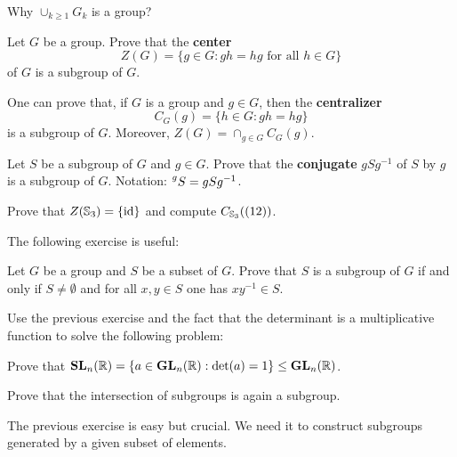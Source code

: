 Why $\cup_{k\geq1}G_k$ is a group? 

\begin{exercise}
\label{xca:center}
        Let $G$ be a group. Prove that the \textbf{center} 
        \[
                Z(G)=\{g\in G:gh=hg\text{ for all $h\in G$}\}
        \]
        of $G$ is a subgroup of $G$. 
\end{exercise}

One can prove that, if $G$ is a group and $g\in G$, then 
the \textbf{centralizer} 
\[
C_G(g)=\{h\in G:gh=hg\}
\]
is a subgroup of $G$. Moreover, 
$Z(G)=\cap_{g\in G}C_G(g)$. 

\begin{exercise}
        \label{xca:conjugate}
        Let $S$ be a subgroup of $G$ and $g\in G$. Prove that
        the \textbf{conjugate} $gSg^{-1}$
        of $S$ by $g$ is a subgroup of $G$. 
        Notation: $\prescript{g}{}S=gSg^{-1}$.
\end{exercise}


\begin{exercise}
\label{xca:center_S3}
        Prove that $Z(\mathbb{S}_3)=\{\operatorname{id}\}$ and compute $C_{\mathbb{S}_3}((12))$.
\end{exercise}

The following exercise is useful: 

\begin{exercise}
\label{xca:subgroup}
        Let $G$ be a group and $S$ be a subset of $G$. 
        Prove that $S$ is a subgroup of $G$ if and only if 
        $S\ne\emptyset$ and for all $x,y\in S$ one has
        $xy^{-1}\in S$.
\end{exercise}

Use the previous exercise and
the fact that the determinant is a multiplicative function
to solve the following problem:

\begin{exercise}
\label{xca:SL_subgroup}
Prove that $\mathbf{SL}_n(\mathbb{R})=\{a\in\mathbf{GL}_n(\mathbb{R}):\det(a)=1\}\leq\mathbf{GL}_n(\mathbb{R})$. 
\end{exercise}

\begin{exercise}
\label{xca:intersection}
    Prove that the intersection of subgroups is again a subgroup.
\end{exercise}

The previous exercise is easy but crucial. We need it 
to construct subgroups generated 
by a given subset of elements. 

